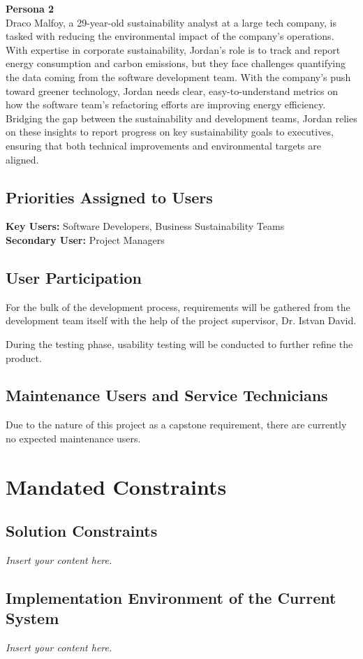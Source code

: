 \documentclass[12pt]{article}
\newcommand{\lips}{\textit{Insert your content here.}}
\begin{document}
\noindent
\textbf{Persona 2} \\
Draco Malfoy, a 29-year-old sustainability analyst at a large tech company, is tasked with reducing the environmental impact of the company’s operations. With expertise in corporate sustainability, Jordan’s role is to track and report energy consumption and carbon emissions, but they face challenges quantifying the data coming from the software development team. With the company's push toward greener technology, Jordan needs clear, easy-to-understand metrics on how the software team’s refactoring efforts are improving energy efficiency. Bridging the gap between the sustainability and development teams, Jordan relies on these insights to report progress on key sustainability goals to executives, ensuring that both technical improvements and environmental targets are aligned.

\subsection{Priorities Assigned to Users}
\textbf{Key Users:} Software Developers, Business Sustainability Teams \\
\textbf{Secondary User:} Project Managers

\subsection{User Participation}
For the bulk of the development process, requirements will be gathered from the development team itself with the help of the project supervisor, Dr. Istvan David.

During the testing phase, usability testing will be conducted to further refine the product.

\subsection{Maintenance Users and Service Technicians}
Due to the nature of this project as a capstone requirement, there are currently no expected maintenance users.

\section{Mandated Constraints}
\subsection{Solution Constraints}
\lips
\subsection{Implementation Environment of the Current System}
\lips
\end{document}
